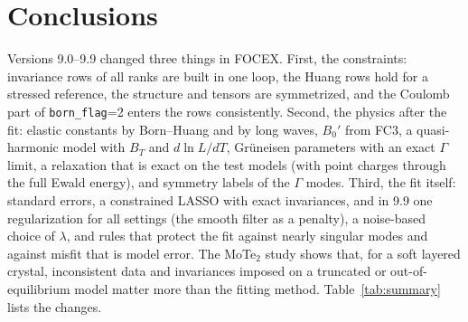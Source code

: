 \documentclass[11pt,a4paper]{article}
\newcommand{\code}[1]{\texttt{#1}}
\begin{document}
\section{Conclusions}
Versions 9.0--9.9 changed three things in FOCEX. First, the constraints: invariance rows of all ranks are
built in one loop, the Huang rows hold for a stressed reference, the structure and tensors are symmetrized,
and the Coulomb part of \code{born\_flag}=2 enters the rows consistently. Second, the physics after the fit:
elastic constants by Born--Huang and by long waves, $B_0'$ from FC3, a quasi-harmonic model with $B_T$ and
$d\ln L/dT$, Gr\"uneisen parameters with an exact $\Gamma$ limit, a relaxation that is exact on the test
models (with point charges through the full Ewald energy), and symmetry labels of the $\Gamma$ modes. Third,
the fit itself: standard errors, a constrained LASSO with exact invariances, and in 9.9 one regularization
for all settings (the smooth filter as a penalty), a noise-based choice of $\lambda$, and rules that protect the
fit against nearly singular modes and against misfit that is model error. The MoTe$_2$ study shows that, for
a soft layered crystal, inconsistent data and invariances imposed on a truncated or out-of-equilibrium
model matter more than the fitting method. Table~\ref{tab:summary} lists the changes.
\end{document}
